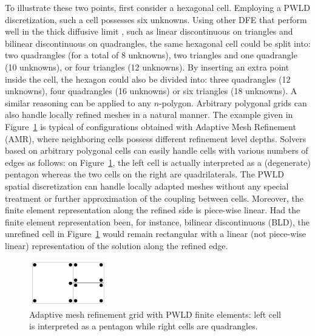 \documentclass[preprint,10pt]{elsarticle}
\renewcommand{\(}{\left(}
\renewcommand{\)}{\right)}
\renewcommand{\[}{\left[}
\renewcommand{\]}{\right]}
\begin{document}
To illustrate these two points, first consider
a hexagonal cell. Employing a PWLD discretization, such a cell possesses six unknowns. Using
other DFE that perform well in the thick diffusive limit \cite{thick_dgfem}, such as 
linear discontinuous on triangles and bilinear discontinuous on quadrangles, the same 
hexagonal cell could be split into: two quadrangles (for a total of 8 unknowns), two 
triangles and one quadrangle (10 unknowns), or four triangles (12 unknowns). By inserting an 
extra point inside the cell, the hexagon could also be divided into: three quadrangles 
(12 unknowns), four quadrangles (16 unknowns) or six triangles (18 unknowns). A 
similar reasoning can be applied to any $n$-polygon. Arbitrary polygonal grids can 
also handle locally refined meshes in a natural manner. The example given
in Figure~\ref {fig_amr} is typical of configurations obtained with Adaptive Mesh 
Refinement (AMR), where neighboring cells possess different refinement level depths. 
Solvers based on arbitrary polygonal cells can easily handle cells 
with various numbers of edges as follows: on Figure~\ref {fig_amr}, the left cell is actually interpreted 
as a (degenerate) pentagon whereas the two cells on the right are quadrilaterals. The PWLD spatial
discretization can handle locally adapted meshes without any special treatment 
or further approximation of the coupling between cells. Moreover, the finite element representation
along the refined side is piece-wise linear. Had the finite element representation been, for instance,
bilinear discontinuous (BLD), the unrefined cell in Figure~\ref {fig_amr} would remain rectangular with a linear
(not piece-wise linear) representation of the solution along the refined edge. 
\begin{figure}[H]
   \centering
   \includegraphics[width=0.3\textwidth]{fig_amr.png}
   \caption{Adaptive mesh refinement grid with PWLD finite elements: left cell is interpreted as a pentagon while right cells are quadrangles.}
   \label{fig_amr}
\end{figure}


\end{document}
